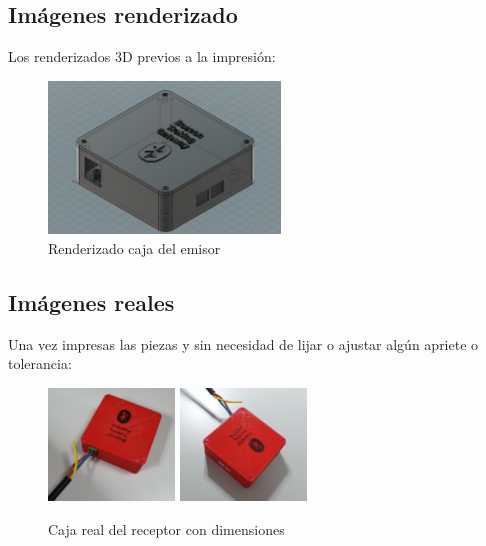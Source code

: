 \documentclass[a4paper ,12pt, onecolumn]{article}
\begin{document}
    \subsection{Imágenes renderizado}
        Los renderizados 3D previos a la impresión:
        \begin{center}
            \begin{figure}[h]
                \centering
                \includegraphics[width=0.55\textwidth]{../mechanical_master.PNG}
                \caption{Renderizado caja del emisor}
                \label{fig:mesh1}
            \end{figure}
        \end{center}
        \paragraph{}

    \subsection{Imágenes reales}
        Una vez impresas las piezas y sin necesidad de lijar o ajustar algún apriete o tolerancia:
        \begin{center}
            \begin{figure}[h]
                \centering
                \includegraphics[width=0.3\textwidth]{../3d_master_1.jpeg}
                \includegraphics[width=0.3\textwidth]{../3d_master_2.jpeg}
                \caption{Caja real del receptor con dimensiones}
                \label{fig:mesh1}
            \end{figure}
        \end{center}
\end{document}
